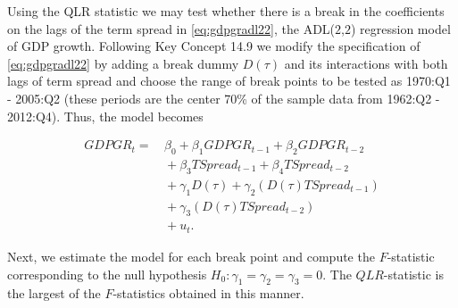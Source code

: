 \documentclass[]{book}
\theoremstyle{definition}
\theoremstyle{definition}
\theoremstyle{definition}
\theoremstyle{remark}
\begin{document}
Using the QLR statistic we may test whether there is a break in the
coefficients on the lags of the term spread in \eqref{eq:gdpgradl22}, the
ADL(\(2\),\(2\)) regression model of GDP growth. Following Key Concept
14.9 we modify the specification of \eqref{eq:gdpgradl22} by adding a
break dummy \(D(\tau)\) and its interactions with both lags of term
spread and choose the range of break points to be tested as 1970:Q1 -
2005:Q2 (these periods are the center 70\% of the sample data from
1962:Q2 - 2012:Q4). Thus, the model becomes

\begin{align*}
    GDPGR_t =& \, \beta_0 + \beta_1 GDPGR_{t-1} + \beta_2 GDPGR_{t-2} \\
            &\,+  \beta_3  TSpread_{t-1} + \beta_4 TSpread_{t-2} \\
            &\,+ \gamma_1 D(\tau) + \gamma_2 (D(\tau) TSpread_{t-1}) \\
            &\,+ \gamma_3 (D(\tau) TSpread_{t-2}) \\
            &\,+ u_t.
\end{align*}

Next, we estimate the model for each break point and compute the
\(F\)-statistic corresponding to the null hypothesis
\(H_0: \gamma_1=\gamma_2=\gamma_3=0\). The \(QLR\)-statistic is the
largest of the \(F\)-statistics obtained in this manner.
\end{document}

